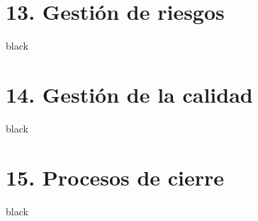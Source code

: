 \documentclass[
11pt, %
]{charter}
\begin{document}
\section{13. Gestión de riesgos}
\label{sec:riesgos}
\begin{consigna}{black}

\end{consigna}


\section{14. Gestión de la calidad}
\label{sec:calidad}
\begin{consigna}{black}

\end{consigna}

\section{15. Procesos de cierre}   
\label{sec:cierre}
\begin{consigna}{black}

\end{consigna}
\end{document}
